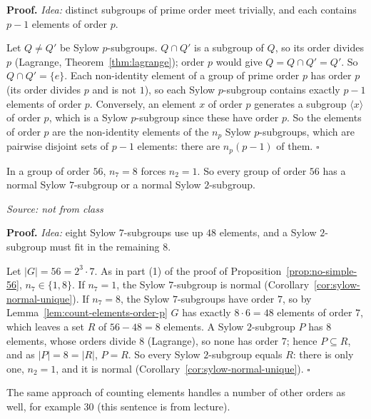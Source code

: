 \documentclass[11pt]{report}
\renewenvironment{proof}[1][Proof]{\noindent\textbf{#1.} }{\hfill$\square$\par\vspace{5pt}}
\newcommand{\srcline}[1]{\par\hfill{\footnotesize\textit{Source: #1}}}
\begin{document}
\begin{proof}
\textit{Idea:} distinct subgroups of prime order meet trivially, and each contains $p - 1$ elements of order $p$.\par
Let $Q \neq Q'$ be Sylow $p$-subgroups. $Q \cap Q'$ is a subgroup of $Q$, so its order divides $p$ (Lagrange, Theorem~\ref{thm:lagrange}); order $p$ would give $Q = Q \cap Q' = Q'$. So $Q \cap Q' = \{e\}$. Each non-identity element of a group of prime order $p$ has order $p$ (its order divides $p$ and is not $1$), so each Sylow $p$-subgroup contains exactly $p - 1$ elements of order $p$. Conversely, an element $x$ of order $p$ generates a subgroup $\langle x \rangle$ of order $p$, which is a Sylow $p$-subgroup since these have order $p$. So the elements of order $p$ are the non-identity elements of the $n_p$ Sylow $p$-subgroups, which are pairwise disjoint sets of $p - 1$ elements: there are $n_p(p - 1)$ of them.
\end{proof}

\begin{propbox}\label{prop:order-56-normal-sylow}
In a group of order $56$, $n_7 = 8$ forces $n_2 = 1$. So every group of order $56$ has a normal Sylow $7$-subgroup or a normal Sylow $2$-subgroup.
\srcline{not from class}
\end{propbox}

\begin{proof}
\textit{Idea:} eight Sylow $7$-subgroups use up $48$ elements, and a Sylow $2$-subgroup must fit in the remaining $8$.\par
Let $|G| = 56 = 2^3 \cdot 7$. As in part (1) of the proof of Proposition~\ref{prop:no-simple-56}, $n_7 \in \{1, 8\}$. If $n_7 = 1$, the Sylow $7$-subgroup is normal (Corollary~\ref{cor:sylow-normal-unique}). If $n_7 = 8$, the Sylow $7$-subgroups have order $7$, so by Lemma~\ref{lem:count-elements-order-p} $G$ has exactly $8 \cdot 6 = 48$ elements of order $7$, which leaves a set $R$ of $56 - 48 = 8$ elements. A Sylow $2$-subgroup $P$ has $8$ elements, whose orders divide $8$ (Lagrange), so none has order $7$; hence $P \subseteq R$, and as $|P| = 8 = |R|$, $P = R$. So every Sylow $2$-subgroup equals $R$: there is only one, $n_2 = 1$, and it is normal (Corollary~\ref{cor:sylow-normal-unique}).
\end{proof}

\begin{rembox}\label{rem:order-56-count}
The same approach of counting elements handles a number of other orders as well, for example $30$ (this sentence is from lecture).
\end{rembox}
\end{document}
